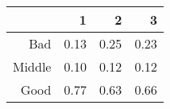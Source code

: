 \begin{table}[ht]
\centering
\begin{tabular}{rrrr}
  \hline
 & 1 & 2 & 3 \\ 
  \hline
Bad & 0.13 & 0.25 & 0.23 \\ 
  Middle & 0.10 & 0.12 & 0.12 \\ 
  Good & 0.77 & 0.63 & 0.66 \\ 
   \hline
\end{tabular}
\end{table}
